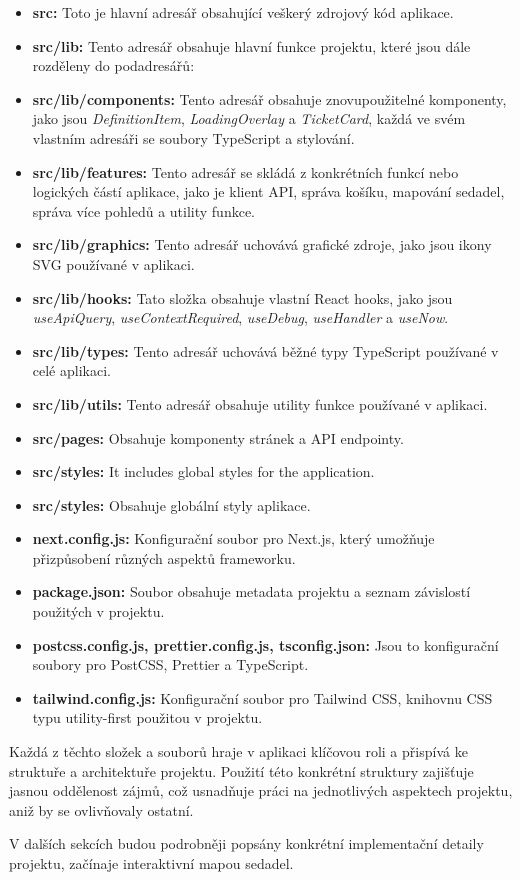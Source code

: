 \begin{itemize}
    \item \textbf{src:} Toto je hlavní adresář obsahující veškerý zdrojový kód aplikace.
    \item \textbf{src/lib:} Tento adresář obsahuje hlavní funkce projektu, které jsou dále rozděleny do podadresářů:
    \item \textbf{src/lib/components:} Tento adresář obsahuje znovupoužitelné komponenty, jako jsou \textit{DefinitionItem}, \textit{LoadingOverlay} a \textit{TicketCard}, každá ve svém vlastním adresáři se soubory TypeScript a stylování.
    \item \textbf{src/lib/features:} Tento adresář se skládá z konkrétních funkcí nebo logických částí aplikace, jako je klient API, správa košíku, mapování sedadel, správa více pohledů a utility funkce.
    \item \textbf{src/lib/graphics:} Tento adresář uchovává grafické zdroje, jako jsou ikony SVG používané v aplikaci.
    \item \textbf{src/lib/hooks:} Tato složka obsahuje vlastní React hooks, jako jsou \textit{useApiQuery}, \textit{useContextRequired}, \textit{useDebug}, \textit{useHandler} a \textit{useNow}.
    \item \textbf{src/lib/types:} Tento adresář uchovává běžné typy TypeScript používané v celé aplikaci.
    \item \textbf{src/lib/utils:} Tento adresář obsahuje utility funkce používané v aplikaci.
    \item \textbf{src/pages:} Obsahuje komponenty stránek a API endpointy.
    \item \textbf{src/styles:} It includes global styles for the application.
    \item \textbf{src/styles:} Obsahuje globální styly aplikace.
    \item \textbf{next.config.js:} Konfigurační soubor pro Next.js, který umožňuje přizpůsobení různých aspektů frameworku.
    \item \textbf{package.json:} Soubor obsahuje metadata projektu a seznam závislostí použitých v projektu.
    \item \textbf{postcss.config.js, prettier.config.js, tsconfig.json:} Jsou to konfigurační soubory pro PostCSS, Prettier a TypeScript.
    \item \textbf{tailwind.config.js:} Konfigurační soubor pro Tailwind CSS, knihovnu CSS typu utility-first použitou v projektu.
\end{itemize}

Každá z těchto složek a souborů hraje v aplikaci klíčovou roli a přispívá ke struktuře a architektuře projektu.
Použití této konkrétní struktury zajišťuje jasnou oddělenost zájmů, což usnadňuje práci na jednotlivých aspektech projektu, aniž by se ovlivňovaly ostatní.

V dalších sekcích budou podrobněji popsány konkrétní implementační detaily projektu, začínaje interaktivní mapou sedadel.
